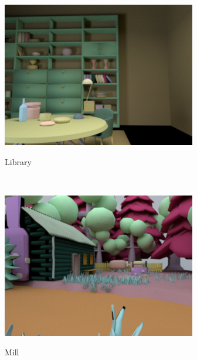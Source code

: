 \documentclass{jov}
\begin{document}
\begin{figure}[t]
\centering
\begin{subfigure}[b]{0.22 \textwidth}
        \caption{Library }
        \includegraphics[width=\textwidth]{../FiguresDraft4/Figure3/Figure3_a.png}
        \label{fig:baseSceneLibrary}
    \end{subfigure}
    ~
    \begin{subfigure}[b]{0.22 \textwidth}
        \caption{Mill}    
        \includegraphics[width=\textwidth]{../FiguresDraft4/Figure3/Figure3_b.png}
        \label{fig:baseSceneMill}
    \end{subfigure}    
    ~
    \begin{subfigure}[b]{0.22 \textwidth}

\end{subfigure}
\end{figure}
\end{document}
